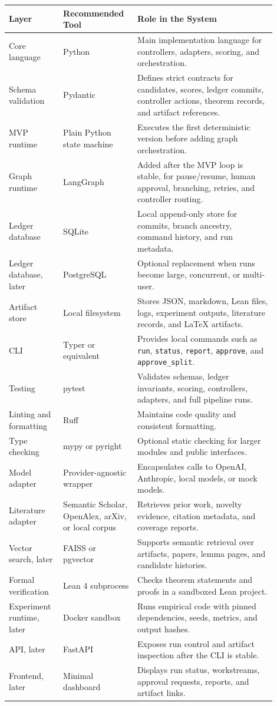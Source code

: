 \documentclass[11pt]{article}
\begin{document}
\begin{center}
\begin{tabular}{p{0.18\linewidth} p{0.24\linewidth} p{0.48\linewidth}}
\toprule
Layer & Recommended Tool & Role in the System \\
\midrule
Core language & Python & Main implementation language for controllers, adapters, scoring, and orchestration. \\
Schema validation & Pydantic & Defines strict contracts for candidates, scores, ledger commits, controller actions, theorem records, and artifact references. \\
MVP runtime & Plain Python state machine & Executes the first deterministic version before adding graph orchestration. \\
Graph runtime & LangGraph & Added after the MVP loop is stable, for pause/resume, human approval, branching, retries, and controller routing. \\
Ledger database & SQLite & Local append-only store for commits, branch ancestry, command history, and run metadata. \\
Ledger database, later & PostgreSQL & Optional replacement when runs become large, concurrent, or multi-user. \\
Artifact store & Local filesystem & Stores JSON, markdown, Lean files, logs, experiment outputs, literature records, and LaTeX artifacts. \\
CLI & Typer or equivalent & Provides local commands such as \texttt{run}, \texttt{status}, \texttt{report}, \texttt{approve}, and \texttt{approve\_split}. \\
Testing & pytest & Validates schemas, ledger invariants, scoring, controllers, adapters, and full pipeline runs. \\
Linting and formatting & Ruff & Maintains code quality and consistent formatting. \\
Type checking & mypy or pyright & Optional static checking for larger modules and public interfaces. \\
Model adapter & Provider-agnostic wrapper & Encapsulates calls to OpenAI, Anthropic, local models, or mock models. \\
Literature adapter & Semantic Scholar, OpenAlex, arXiv, or local corpus & Retrieves prior work, novelty evidence, citation metadata, and coverage reports. \\
Vector search, later & FAISS or pgvector & Supports semantic retrieval over artifacts, papers, lemma pages, and candidate histories. \\
Formal verification & Lean 4 subprocess & Checks theorem statements and proofs in a sandboxed Lean project. \\
Experiment runtime, later & Docker sandbox & Runs empirical code with pinned dependencies, seeds, metrics, and output hashes. \\
API, later & FastAPI & Exposes run control and artifact inspection after the CLI is stable. \\
Frontend, later & Minimal dashboard & Displays run status, workstreams, approval requests, reports, and artifact links. \\
\bottomrule
\end{tabular}
\end{center}
\end{document}
